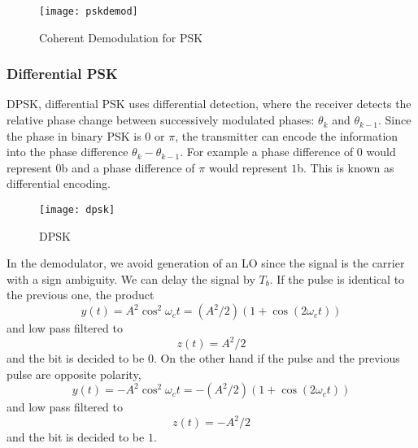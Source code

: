 \documentclass{article}
\begin{document}
    \begin{figure}[h]
        \centering
        \texttt{[image: pskdemod]}
        \caption{Coherent Demodulation for PSK}
    \end{figure}

    \subsubsection{Differential PSK}
    DPSK, differential PSK uses differential detection, where the receiver detects the relative phase change
    between successively modulated phases: $\theta_k$ and $\theta_{k-1}$. Since the phase in binary PSK is
    $0$ or $\pi$, the transmitter can encode the information into the phase difference $\theta_k - \theta_{k-1}$.
    For example a phase difference of $0$ would represent $0$b and a phase difference of $\pi$ would represent
    $1$b. This is known as differential encoding. 
    
    \begin{figure}[h]
        \centering
        \texttt{[image: dpsk]}
        \caption{DPSK}
    \end{figure}
    
    In the demodulator, we avoid generation of an LO since
    the signal is the carrier with a sign ambiguity. We can delay the signal by $T_b$. If the pulse is identical
    to the previous one, the product 
    \begin{equation}
        y(t) = A^2\cos^2\omega_ct = (A^2/2)(1+\cos(2\omega_ct))
    \end{equation}
    and low pass filtered to
    \begin{equation}
        z(t) = A^2/2
    \end{equation}
    and the bit is decided to be $0$.
    On the other hand if the pulse and the previous pulse are opposite polarity, 
    \begin{equation}
        y(t) = -A^2\cos^2\omega_ct = -(A^2/2)(1+\cos(2\omega_ct))
    \end{equation}
    and low pass filtered to
    \begin{equation}
        z(t) = -A^2/2
    \end{equation}
    and the bit is decided to be $1$.
\end{document}
